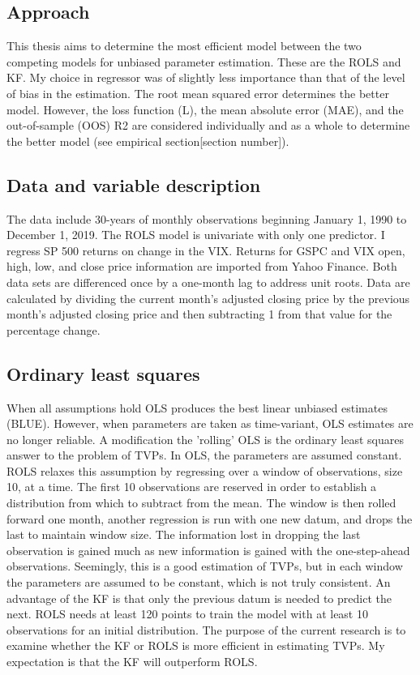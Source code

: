 \documentclass[12pt, letterpaper]{article}
\begin{document}
	\subsection{Approach}
	This thesis aims to determine the most efficient model between the two competing models for unbiased parameter estimation. These are the ROLS and KF. My choice in regressor was  of slightly less importance than that of the level of bias in the estimation. The root mean squared error determines the better model. However, the loss function (L), the mean absolute error (MAE), and the out-of-sample (OOS) R2 are considered individually and as a whole to determine the better model (see empirical section[section number]). 
	\subsection{Data and variable description}
	The data include 30-years of monthly observations beginning January 1, 1990 to December 1, 2019. The ROLS model is univariate with only one predictor. I regress SP 500 returns on change in the VIX. Returns for GSPC and VIX open, high, low, and close price information are imported from Yahoo Finance. Both data sets are differenced once by a one-month lag to address unit roots. Data are calculated by dividing the current month’s adjusted closing price by the previous month’s adjusted closing price and then subtracting 1 from that value for the percentage change. 
	
	\subsection{Ordinary least squares}
	When all assumptions hold OLS produces the best linear unbiased estimates (BLUE). However, when parameters are taken as time-variant, OLS estimates are no longer reliable. A modification the 'rolling' OLS is the ordinary least squares answer to the problem of TVPs. In OLS, the parameters are assumed constant. ROLS relaxes this assumption by regressing over a window of observations, size 10, at a time. The first 10 observations are reserved in order to establish a distribution from which to subtract from the mean. The window is then rolled forward one month, another regression is run with one new datum, and drops the last to maintain window size. The information lost in dropping the last observation is gained much as new information is gained with the one-step-ahead observations. Seemingly, this is a good estimation of TVPs, but in each window the parameters are assumed to be constant, which is not truly consistent. An advantage of the KF is that only the previous datum is needed to predict the next. ROLS needs at least 120 points to train the model with at least 10 observations for an initial distribution. The purpose of the current research is to examine whether the KF or ROLS is more efficient in estimating TVPs. My expectation is that the KF will outperform ROLS. 
	
\end{document}
